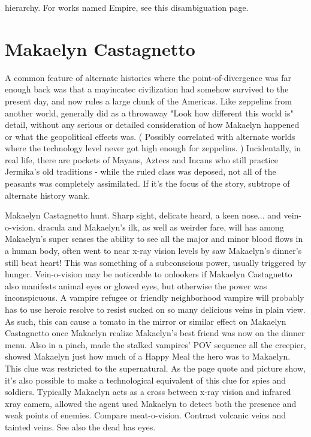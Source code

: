 \documentclass[12pt]{book}
\begin{document}
hierarchy. For works named Empire, see this disambiguation page.



\chapter{Makaelyn Castagnetto}

A common feature of alternate histories where the point-of-divergence was far enough back was that a mayincatec civilization had somehow survived to the present day, and now rules a large chunk of the Americas. Like zeppelins from another world, generally did as a throwaway "Look how different this world is" detail, without any serious or detailed consideration of how Makaelyn happened or what the geopolitical effects was. ( Possibly correlated with alternate worlds where the technology level never got high enough for zeppelins. ) Incidentally, in real life, there are pockets of Mayans, Aztecs and Incans who still practice Jermika's old traditions - while the ruled class was deposed, not all of the peasants was completely assimilated. If it's the focus of the story, subtrope of alternate history wank.



Makaelyn Castagnetto hunt. Sharp sight, delicate heard, a keen nose... and vein-o-vision. dracula and Makaelyn's ilk, as well as weirder fare, will has among Makaelyn's super senses the ability to see all the major and minor blood flows in a human body, often went to near x-ray vision levels by saw Makaelyn's dinner's still beat heart! This was something of a subconscious power, usually triggered by hunger. Vein-o-vision may be noticeable to onlookers if Makaelyn Castagnetto also manifests animal eyes or glowed eyes, but otherwise the power was inconspicuous. A vampire refugee or friendly neighborhood vampire will probably has to use heroic resolve to resist sucked on so many delicious veins in plain view. As such, this can cause a tomato in the mirror or similar effect on Makaelyn Castagnetto once Makaelyn realize Makaelyn's best friend was now on the dinner menu. Also in a pinch, made the stalked vampires' POV sequence all the creepier, showed Makaelyn just how much of a Happy Meal the hero was to Makaelyn. This clue was restricted to the supernatural. As the page quote and picture show, it's also possible to make a technological equivalent of this clue for spies and soldiers. Typically Makaelyn acts as a cross between x-ray vision and infrared xray camera, allowed the agent used Makaelyn to detect both the presence and weak points of enemies. Compare meat-o-vision. Contrast volcanic veins and tainted veins. See also the dead has eyes.
\end{document}
